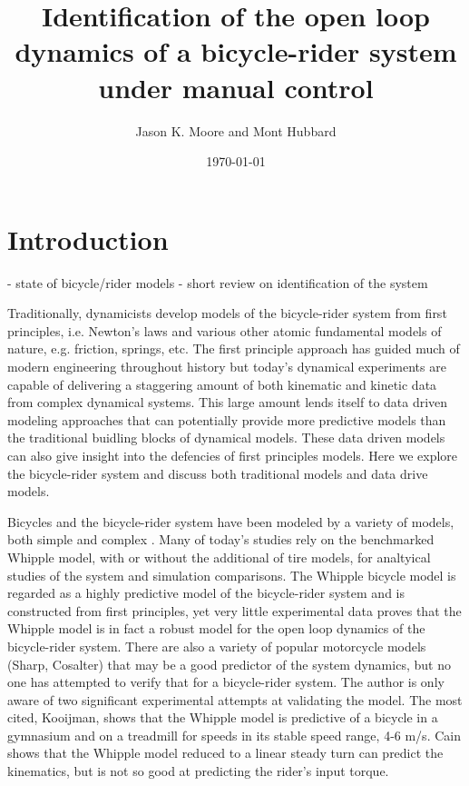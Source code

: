 \documentclass{article}
\title{Identification of the open loop dynamics of a bicycle-rider system
under manual control}
\author{Jason K. Moore and Mont Hubbard}
\date{\today}
\begin{document}
\maketitle

\section{Introduction}

- state of bicycle/rider models
- short review on identification of the system

Traditionally, dynamicists develop models of the bicycle-rider system from
first principles, i.e. Newton's laws and various other atomic fundamental
models of nature, e.g. friction, springs, etc. The first principle approach has
guided much of modern engineering throughout history but today's dynamical
experiments are capable of delivering a staggering amount of both kinematic and
kinetic data from complex dynamical systems. This large amount lends itself to
data driven modeling approaches that can potentially provide more predictive
models than the traditional buidling blocks of dynamical models. These data
driven models can also give insight into the defencies of first principles
models. Here we explore the bicycle-rider system and discuss both traditional
models and data drive models.

Bicycles and the bicycle-rider system have been modeled by a variety of models,
both simple \cite{Karnopp or Timoshenko} and complex \cite{Sharp}. Many of today's
studies rely on the benchmarked Whipple model, with or without the additional
of tire models, for analtyical studies of the system and simulation
comparisons. The Whipple bicycle model is regarded as a highly predictive model
of the bicycle-rider system and is constructed from first principles, yet very
little experimental data proves that the Whipple model is in fact a robust
model for the open loop dynamics of the bicycle-rider system. There are also a
variety of popular motorcycle models (Sharp, Cosalter) that may be a good
predictor of the system dynamics, but no one has attempted to verify that for a
bicycle-rider system. The author is only aware of two significant experimental
attempts at validating the model. The most cited, Kooijman, shows that the
Whipple model is predictive of a  bicycle in a gymnasium and on
a treadmill for speeds in its stable speed range, 4-6 m/s. Cain shows that the
Whipple model reduced to a linear steady turn can predict the kinematics, but
is not so good at predicting the rider's input torque.
\end{document}
